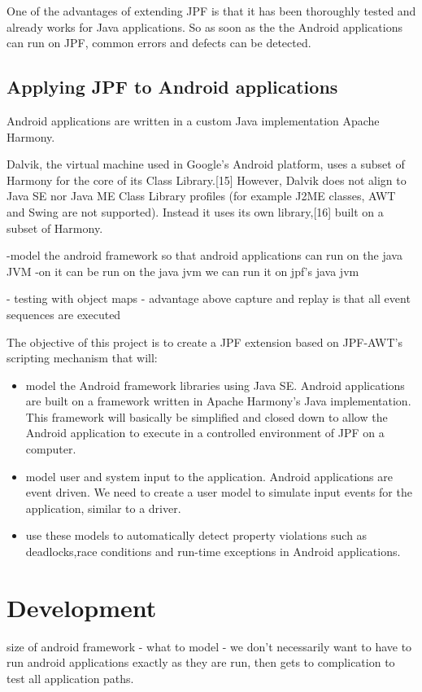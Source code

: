 \documentclass{acm_proc_article-sp}
\begin{document}
One of the advantages of extending JPF is that it has been thoroughly tested and already works for Java applications. So as soon as the the
Android applications can run on JPF, common errors and defects can be detected.

\subsection{Applying JPF to Android applications}
Android applications are written in a custom Java implementation Apache Harmony.

Dalvik, the virtual machine used in Google's Android platform, uses a subset of Harmony for the core of its Class Library.[15] However,
Dalvik does not align to Java SE nor Java ME Class Library profiles (for example J2ME classes, AWT and Swing are not supported). Instead it
uses its own library,[16] built on a subset of Harmony.

-model the android framework so that android applications can run on the java JVM
-on it can be run on the java jvm we can run it on jpf’s java jvm

- testing with object maps
- advantage above capture and replay is that all event sequences are executed



The objective of this project is to create a JPF extension based on JPF-AWT's scripting mechanism that will:
\begin{itemize}
 \item model the Android framework libraries using Java SE. Android applications are built on a framework written in Apache Harmony's Java
implementation. This framework will basically be simplified and closed down to allow the Android application to execute in a controlled
environment of JPF on a computer.

 \item model user and system input to the application. Android applications are event driven. We need to create a user model to simulate
input events for the application, similar to a driver. 

 \item use these models to automatically detect property violations such as deadlocks,race conditions and run-time exceptions in Android
applications.

\end{itemize}
\newpage
\section{Development}
size of android framework - what to model
  - we don't necessarily want to have to run android applications exactly as they are run, then gets to complication to test all application
  paths.
\end{document}
